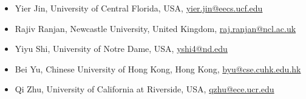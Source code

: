\begin{itemize}
    \item Yier Jin, University of Central Florida, USA,       \href{mailto:yier.jin@eecs.ucf.edu}{yier.jin@eecs.ucf.edu}
    \item Rajiv Ranjan, Newcastle University, United Kingdom, \href{mailto:raj.ranjan@ncl.ac.uk}{raj.ranjan@ncl.ac.uk}
    \item Yiyu Shi, University of Notre Dame, USA,            \href{mailto:yshi4@nd.edu}{yshi4@nd.edu}
    \item Bei Yu, Chinese University of Hong Kong, Hong Kong, \href{mailto:byu@cse.cuhk.edu.hk}{byu@cse.cuhk.edu.hk}
    \item Qi Zhu, University of California at Riverside, USA, \href{mailto:qzhu@ece.ucr.edu}{qzhu@ece.ucr.edu}
\end{itemize}



